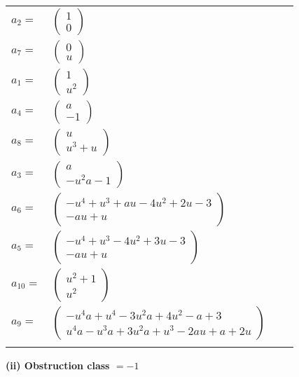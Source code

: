 \documentclass[1p]{elsarticle_modified}
\theoremstyle{definition}
\begin{document}
\begin{tabular}{m{7pt} m{180pt} m{7pt} m{180pt} }
\flushright $a_{2}=$&$\begin{pmatrix}1\\0\end{pmatrix}$ \\
\flushright $a_{7}=$&$\begin{pmatrix}0\\u\end{pmatrix}$ \\
\flushright $a_{1}=$&$\begin{pmatrix}1\\u^2\end{pmatrix}$ \\
\flushright $a_{4}=$&$\begin{pmatrix}a\\-1\end{pmatrix}$ \\
\flushright $a_{8}=$&$\begin{pmatrix}u\\u^3+u\end{pmatrix}$ \\
\flushright $a_{3}=$&$\begin{pmatrix}a\\- u^2 a-1\end{pmatrix}$ \\
\flushright $a_{6}=$&$\begin{pmatrix}- u^4+u^3+a u-4 u^2+2 u-3\\- a u+u\end{pmatrix}$ \\
\flushright $a_{5}=$&$\begin{pmatrix}- u^4+u^3-4 u^2+3 u-3\\- a u+u\end{pmatrix}$ \\
\flushright $a_{10}=$&$\begin{pmatrix}u^2+1\\u^2\end{pmatrix}$ \\
\flushright $a_{9}=$&$\begin{pmatrix}- u^4 a+u^4-3 u^2 a+4 u^2- a+3\\u^4 a- u^3 a+3 u^2 a+u^3-2 a u+a+2 u\end{pmatrix}$\\&\end{tabular}
\flushleft \textbf{(ii) Obstruction class $= -1$}\\~\\
\end{document}
